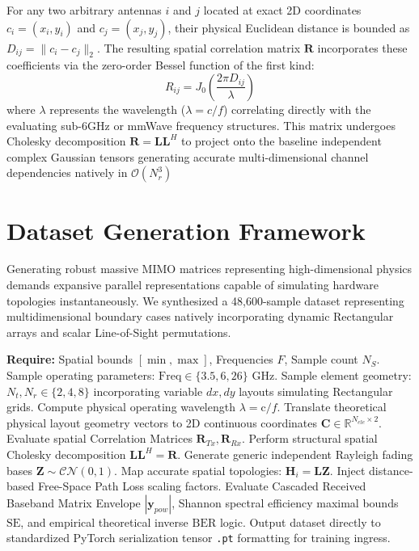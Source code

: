\documentclass[conference]{IEEEtran}
\begin{document}
For any two arbitrary antennas $i$ and $j$ located at exact 2D coordinates $c_i = (x_i, y_i)$ and $c_j = (x_j, y_j)$, their physical Euclidean distance is bounded as $D_{ij} = \|c_i - c_j\|_2$. The resulting spatial correlation matrix $\mathbf{R}$ incorporates these coefficients via the zero-order Bessel function of the first kind:
\begin{equation}
R_{ij} = J_0\left(\frac{2\pi D_{ij}}{\lambda}\right)
\end{equation}
where $\lambda$ represents the wavelength ($\lambda = c / f$) correlating directly with the evaluating sub-6GHz or mmWave frequency structures. This matrix undergoes Cholesky decomposition $\mathbf{R} = \mathbf{L}\mathbf{L}^H$ to project onto the baseline independent complex Gaussian tensors generating accurate multi-dimensional channel dependencies natively in $\mathcal{O}(N_{r}^3)$

\section{Dataset Generation Framework}

Generating robust massive MIMO matrices representing high-dimensional physics demands expansive parallel representations capable of simulating hardware topologies instantaneously. We synthesized a 48,600-sample dataset representing multidimensional boundary cases natively incorporating dynamic Rectangular arrays and scalar Line-of-Sight permutations.

\begin{algorithm}
\caption{Dataset Generation Vectorized Pipeline}
\label{alg:dataset}
\begin{algorithmic}[1]
\STATE \textbf{Require:} Spatial bounds $[\min, \max]$, Frequencies $F$, Sample count $N_S$.
    \STATE Sample operating parameters: $\text{Freq} \in \{3.5, 6, 26\} \text{ GHz}$.
    \STATE Sample element geometry: $N_t, N_r \in \{2, 4, 8\}$ incorporating variable $dx, dy$ layouts simulating Rectangular grids.
    \STATE Compute physical operating wavelength $\lambda = \text{c} / f$.
    \STATE Translate theoretical physical layout geometry vectors to 2D continuous coordinates $\mathbf{C} \in \mathbb{R}^{N_{ele} \times 2}$.
    \STATE Evaluate spatial Correlation Matrices $\mathbf{R}_{Tx}, \mathbf{R}_{Rx}$.
    \STATE Perform structural spatial Cholesky decomposition $\mathbf{L} \mathbf{L}^H = \mathbf{R}$.
    \STATE Generate generic independent Rayleigh fading bases $\mathbf{Z} \sim \mathcal{CN}(0,1)$.
    \STATE Map accurate spatial topologies: $\mathbf{H}_{i} = \mathbf{L} \mathbf{Z}$.
    \STATE Inject distance-based Free-Space Path Loss scaling factors.
    \STATE Evaluate Cascaded Received Baseband Matrix Envelope $|\mathbf{y}_{pow}|$, Shannon spectral efficiency maximal bounds $\text{SE}$, and empirical theoretical inverse $\text{BER}$ logic.
\ENDFOR
\STATE Output dataset directly to standardized PyTorch serialization tensor \texttt{.pt} formatting for training ingress.
\end{algorithmic}
\end{algorithm}
\end{document}
